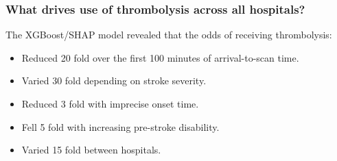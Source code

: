 \begin{frame}
\frametitle{What drives use of thrombolysis across all hospitals?}

The XGBoost/SHAP model revealed that the odds of receiving thrombolysis:

\vspace{3mm}

\begin{itemize}
    \item Reduced 20 fold over the first 100 minutes of arrival-to-scan time.
    \item Varied 30 fold depending on stroke severity.
    \item Reduced 3 fold with imprecise onset time.
    \item Fell 5 fold with increasing pre-stroke disability.
    \item Varied 15 fold between hospitals. 
\end{itemize}

\end{frame}